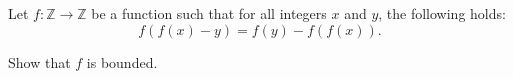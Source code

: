 Let $f:\mathbb{Z}\to\mathbb{Z}$ be a function such that for all integers $x$ and $y$,  the following holds:\[f(f(x)-y)=f(y)-f(f(x)).\]

Show that $f$ is bounded.